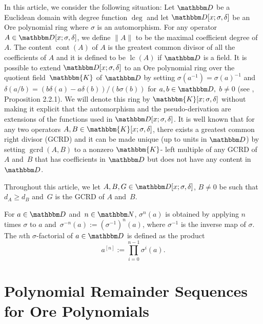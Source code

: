 \documentclass[3p,11pt,preprint]{elsarticle}
\let\set\mathbbm
\def\k{\set D}
\newcommand{\qk}{\set{K}}
\newcommand{\D}{x}
\newcommand{\alg}{\k[\D;\sigma,\delta]}
\newcommand{\qalg}{\qk[\D;\sigma,\delta]}
\newcommand{\lc}{\operatorname{lc}}
\newcommand{\gcrd}{\operatorname{gcrd}}
\newcommand{\cont}{\operatorname{cont}}
\begin{document}
In this article, we consider the following situation: Let $\k$ be a Euclidean domain with degree function $\deg$ and let $\alg$ be an Ore polynomial ring where $\sigma$ is an automorphism. For any operator~$A\in\alg$, we define $\lVert A\rVert$ to be the maximal coefficient degree of $A$. The content $\cont(A)$ of $A$ is the greatest common divisor of all the coefficients of $A$ and it is defined to be $\lc(A)$ if $\k$ is a field. It is possible to extend $\alg$ to an Ore polynomial ring over the quotient field~$\qk$ of $\k$ by setting $\sigma(a^{-1}) = \sigma(a)^{-1}$ and~$\delta(a/b) = (b\delta(a)-a\delta(b))/(b\sigma(b))$ for $a,b\in\k,$ $b\neq 0$ (see \cite{zli2}, Proposition 2.2.1). We will denote this ring by $\qalg$ without making it explicit that the automorphism and the pseudo-derivation are extensions of the functions used in $\alg$. It is well known that for any two operators $A,B\in\qalg$, there exists a greatest common right divisor (GCRD) and it can be made unique (up to units in $\k$) by 
setting $\gcrd(A,B)$ to a nonzero $\qk$-
left multiple of any GCRD of $A$ and~$B$ that has coefficients in $\k$ but does not have any content in $\k$. 

Throughout this article, we let $A,B,G\in\alg$, $B\neq 0$ be such that $d_A\geq d_B$ and~$G$ is the GCRD of $A$ and~$B$.

\begin{definition}
 For $a\in\k$ and~$n\in\set N$, $\sigma^n(a)$ is obtained by applying $n$ times $\sigma$ to $a$ and~$\sigma^{-n}(a):=(\sigma^{-1})^n(a)$, where $\sigma^{-1}$ is the inverse map of $\sigma$. The $n$th $\sigma$-factorial of $a\in\k$ is defined as the product \[a^{[n]} := \prod\limits_{i=0}^{n-1}{\sigma^i(a)}.\]
\end{definition}

\section{Polynomial Remainder Sequen\-ces for Ore Polynomials}
\label{prssec}
\end{document}
